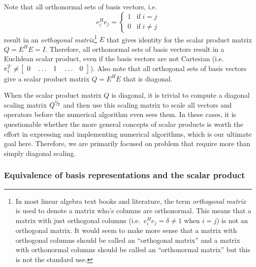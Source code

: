 Note that all orthonormal sets of basis vectors, i.e.
\[
e_i^H e_j = \left\{ \begin{array}{ll} 1 & \mbox{if} \; i = j \\ 0 & \mbox{if} \; i \ne j \end{array}  \right.
\]
result in an \textit{orthogonal matrix}\footnote{
%
In most linear algebra text books and
literature, the term {}\textit{orthogonal matrix} is used to denote a matrix
who's columns are orthonormal.  This means that a matrix with just orthogonal
columns (i.e.\ $e_i^H e_j = \delta \ne 1$ when $i=j$) is not an orthogonal
matrix.  It would seem to make more sense that a matrix with orthogonal
columns should be called an ``orthogonal matrix'' and a matrix with
orthonormal columns should be called an ``orthonormal matrix'' but this is not
the standard use.
%
} $E$ that gives identity for the scalar product matrix $Q = E^H E = I$.
Therefore, all orthonormal sets of basis vectors result in a Euclidean scalar
product, even if the basis vectors are not Cartesian (i.e.\ $e_i^T {}\ne
{\bmat{ccccc} 0 & {}\ldots & 1 & {}\ldots & 0 {}\emat}$). Also note that all
orthogonal sets of basis vectors give a scalar product matrix $Q = E^H E$ that
is diagonal.

When the scalar product matrix $Q$ is diagonal, it is trivial to compute a
diagonal scaling matrix $Q^{\myonehalf}$ and then use this scaling matrix to
scale all vectors and operators before the numerical algorithm even sees them.
In these cases, it is questionable whether the more general concepts of scalar
products is worth the effort in expressing and implementing numerical
algorithms, which is our ultimate goal here.  Therefore, we are primarily
focused on problem that require more than simply diagonal scaling.

\subsubsection{Equivalence of basis representations and the scalar product}

